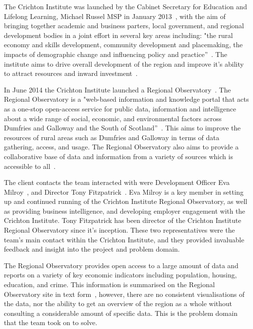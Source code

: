 \documentclass{l3proj}
\begin{document}

The Crichton Institute was launched by the Cabinet Secretary for Education and Lifelong Learning, Michael Russel MSP in January 2013~\cite{CrichtonInsituteFounded}, with the aim of bringing together academic and business parters, local government, and regional development bodies in a joint effort in several key areas including: "the rural economy and skills development, community development and placemaking, the impacts of demographic change and influencing policy and practice''~\cite{CrichtonInsituteCoreAims}. The institute aims to drive overall development of the region and improve it's ability to attract resources and inward investment~\cite{CrichtonInstituteAboutUs}.

In June 2014 the Crichton Institute launched a Regional Observatory~\cite{CrichtonInstituteRegionalObservatory}. The Regional Observatory is a "web-based information and knowledge portal that acts as a one-stop open-access service for public data, information and intelligence about a wide range of social, economic, and environmental factors across Dumfries and Galloway and the South of Scotland''~\cite{ScotGovOpenDataResourcePack}. This aims to improve the resources of rural areas such as Dumfries and Galloway in terms of data gathering, access, and usage. The Regional Observatory also aims to provide a collaborative base of data and information from a variety of sources which is accessible to all~\cite{ScotGovOpenDataResourcePack}.

The client contacts the team interacted with were Development Officer Eva Milroy~\cite{EvaMilroyLinkedIn}, and Director Tony Fitzpatrick~\cite{TonyFitzpatrickLinkedIn}. Eva Milroy is a key member in setting up and continued running of the Crichton Institute Regional Observatory, as well as providing business intelligence, and developing employer engagement with the Crichton Institute. Tony Fitzpatrick has been director of the Crichton Institute Regional Observatory since it's inception. These two representatives were the team's main contact within the Crichton Institute, and they provided invaluable feedback and insight into the project and problem domain.


The Regional Observatory provides open access to a large amount of data and reports on a variety of key economic indicators including population, housing, education, and crime. This information is summarised on the Regional Observatory site in text form~\cite{PopulationHealthReport}, however, there are no consistent visualisations of the data, nor the ability to get an overview of the region as a whole without consulting a considerable amount of specific data. This is the problem domain that the team took on to solve.
\end{document}
